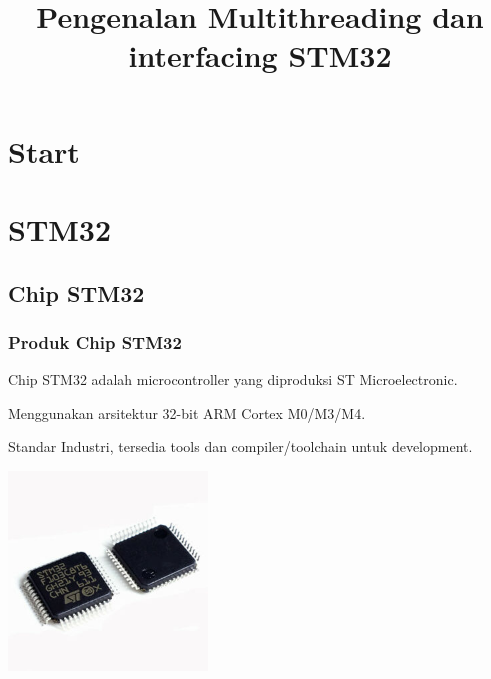 \documentclass[table,dvipsnames]{beamer}
\title[STM32 Beginner Guide]{Pengenalan Multithreading dan interfacing STM32}
\author{}
\institute[Achmadi ST MT]{
	Institut Teknologi Sepuluh November  \\
	\vspace{10pt}
	FTITOS
	\vspace{10pt}
	CodeDirect
	\medskip
	\textit{}
}
\date{}
\begin{document}
	
	\section{Start}
	
	\begin{frame}
	\titlepage
	\end{frame}

	\section{STM32}
	\subsection{Chip STM32}
	\begin{frame}
		\frametitle{Produk Chip STM32}
		\begin{block}{}
			Chip STM32 adalah microcontroller yang diproduksi ST Microelectronic.
		\end{block}
	
		\begin{block}{}
			Menggunakan arsitektur 32-bit ARM Cortex M0/M3/M4.
		\end{block}
	
		\begin{block}{}
			Standar Industri, tersedia tools dan compiler/toolchain untuk development.
		\end{block}
		\begin{center}
			\includegraphics[width=150pt]{images/stm32f103c8}
		\end{center}
	\end{frame}
\end{document}
